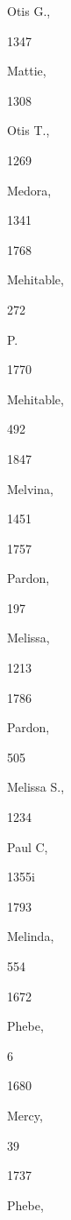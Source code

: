 \documentclass{book}
\begin{document}
{{Otis G., 


1347 




Mattie, 


1308 




Otis T., 


1269 




Medora, 


1341 








1768 


Mehitable, 


272 




P. 




1770 


Mehitable, 


492 








1847 


Melvina, 


1451 


1757 


Pardon, 


197 




Melissa, 


1213 


1786 


Pardon, 


505 




Melissa S., 


1234 




Paul C, 


1355i 


1793 


Melinda, 


554 


1672 


Phebe, 


6 


1680 


Mercy, 


39 


1737 


Phebe, 


}}
\end{document}
